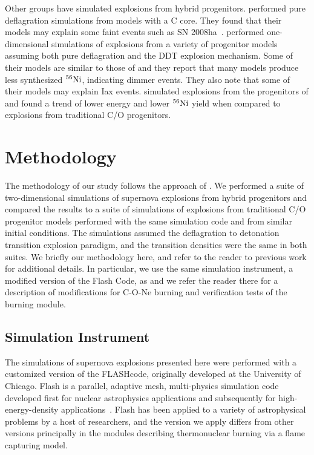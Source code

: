 \documentclass[iop,apj]{emulateapj}
\newcommand{\Ni}[1]{\ensuremath{{}^{#1}{\rm Ni}}}
\newcommand{\code}[1]{\textsc{#1}}
\newcommand{\FLASH}{\code{FLASH}}
\begin{document}
Other groups have simulated explosions from hybrid progenitors. 
\citet{kromeretal2015} performed pure deflagration simulations from models 
with a C core. They found that their models may explain some faint events 
such as SN 2008ha~\citep{foleyetal2009}.
\citet{bravoetal2016} performed one-dimensional simulations of explosions from 
a variety of progenitor models assuming both pure deflagration and the DDT 
explosion mechanism. 
Some of their models are similar to those of \citep{denissenkovetal2015} and 
they report that many models produce less synthesized
\Ni{56}, indicating dimmer events. They also note that some of their
models may explain Iax events.
\citet{willcoxetal2016} simulated explosions from the progenitors of 
\citep{denissenkovetal2015} and found a trend of lower energy and lower
\Ni{56} yield when compared to explosions from traditional C/O progenitors.


\section{Methodology}

The methodology of our study follows the approach of \citet{willcoxetal2016}. 
We performed a suite of two-dimensional simulations of supernova explosions
from hybrid progenitors and compared the results to a suite of simulations
of explosions from traditional C/O progenitor models performed with the
same simulation code and from similar initial conditions. The simulations assumed
the deflagration to detonation transition explosion paradigm, and the
transition densities were the same in both suites. We briefly our methodology
here, and refer to the reader to previous work for additional details.
In particular, we use the same simulation instrument, a modified version
of the Flash Code, as \citet{willcoxetal2016} and we refer the reader there 
for a description of modifications for C-O-Ne burning and verification tests
of the burning module.

\subsection{Simulation Instrument}

The simulations of supernova explosions presented here were performed
with a customized version of the \FLASH code, originally developed
at the University of Chicago.
Flash is a parallel, adaptive mesh, multi-physics simulation code
developed first for nuclear astrophysics applications and subsequently
for high-energy-density applications~\cite{Fryxetal00,calder.curtis.ea:high-performance,
calder.fryxell.ea:on,flash_pragmatic,flash_evolution}. 
Flash has been applied to a variety of astrophysical problems by a host
of researchers, and the version we apply differs from other versions
principally in the modules describing thermonuclear burning via a 
flame capturing model. 
\end{document}
